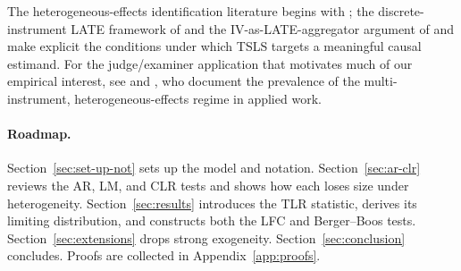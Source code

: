 The heterogeneous-effects identification literature begins with \cite{angristTwoStageLeastSquares1995}; the discrete-instrument LATE framework of %
\cite{imbensAngristIdentificationEstimation1994} and the IV-as-LATE-aggregator argument of \cite{angristInterpretationInstrumentalVariables2000} and \cite{mogstadCausalInterpretationTwoStage2021} make explicit the conditions under which TSLS targets a meaningful causal estimand. %
For the judge/examiner application that motivates much of our empirical interest, see  %
\cite{chunFrandsenExaminerDesign} and  %
\cite{hullGoldsmithPinkhamExaminer}, who document the prevalence of the multi-instrument, heterogeneous-effects regime in applied work.

\paragraph*{Roadmap.}
Section~\ref{sec:set-up-not} sets up the model and notation. Section~\ref{sec:ar-clr} reviews the AR, LM, and CLR tests and shows how each loses size under heterogeneity. Section~\ref{sec:results} introduces the TLR statistic, derives its limiting distribution, and constructs both the LFC and Berger–Boos tests. Section~\ref{sec:extensions} drops strong exogeneity. Section~\ref{sec:conclusion} concludes. Proofs are collected in Appendix~\ref{app:proofs}.
